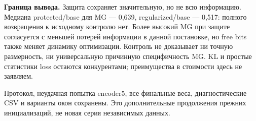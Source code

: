 \documentclass[10pt,a4paper]{article}
\begin{document}
\textbf{Граница вывода.} Защита сохраняет значительную, но не всю информацию. Медиана protected/base для MG --- 0,639, regularized/base --- 0,517: полного возвращения к исходному контролю нет. Более высокий MG при защите согласуется с меньшей потерей информации в данной постановке, но free bits также меняет динамику оптимизации. Контроль не доказывает ни точную размерность, ни универсальную причинную специфичность MG. KL и простые статистики loss остаются конкурентами; преимущества в стоимости здесь не заявляем.

Протокол, неудачная попытка encoder5, все финальные веса, диагностические CSV и варианты окон сохранены. Это дополнительные продолжения прежних инициализаций, не новая серия независимых данных.
\end{document}
